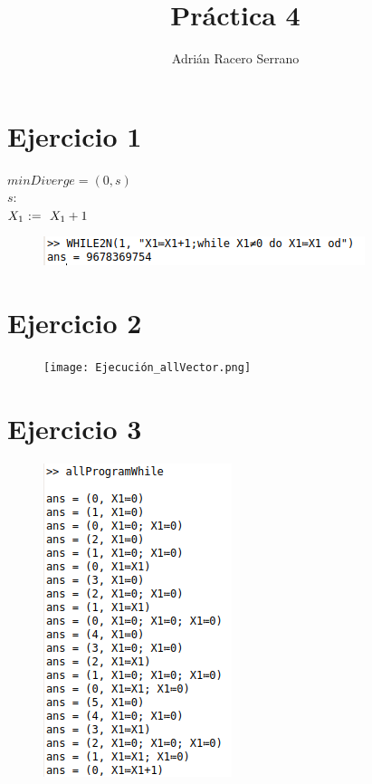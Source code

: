 \documentclass[11pt]{article}
\title{\textbf{Práctica 4}}
\author{Adrián Racero Serrano}
\date{}
\begin{document}
\maketitle
\thispagestyle{empty}

\section*{Ejercicio 1}
\begin{whilecode}[H]
$minDiverge=(0, s)$
\\
$s:$
\\
 $X_1 \Assig X_1 + 1$\;

\end{whilecode}

\begin{figure}[htp]
\centering
\includegraphics[scale=0.70]{while2n.png}
\end{figure}

\newpage
\section*{Ejercicio 2}



\begin{figure}[htp]
\centering
\texttt{[image: Ejecución\_allVector.png]}
\end{figure}

\newpage
\section*{Ejercicio 3}


\begin{figure}[htp]
\centering
\includegraphics[scale=0.60]{allProgramExecution.png}
\end{figure}
\end{document}
